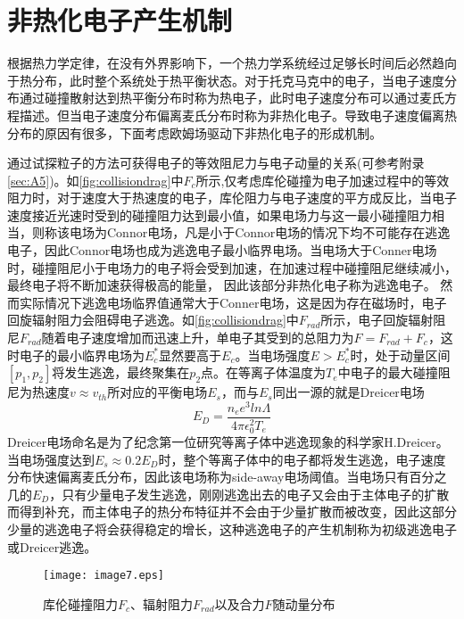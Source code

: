     

\section{非热化电子产生机制}
	根据热力学定律，在没有外界影响下，一个热力学系统经过足够长时间后必然趋向于热分布，此时整个系统处于热平衡状态。对于托克马克中的电子，当电子速度分布通过碰撞散射达到热平衡分布时称为热电子，此时电子速度分布可以通过麦氏方程描述。但当电子速度分布偏离麦氏分布时称为非热化电子。导致电子速度偏离热分布的原因有很多，下面考虑欧姆场驱动下非热化电子的形成机制。\par
	通过试探粒子的方法可获得电子的等效阻尼力与电子动量的关系\cite{RN814,RN1817}(可参考附录\autoref{sec:A5})。如\autoref{fig:collisiondrag}中$F_c$所示,仅考虑库伦碰撞为电子加速过程中的等效阻力时，对于速度大于热速度的电子，库伦阻力与电子速度的平方成反比，当电子速度接近光速时受到的碰撞阻力达到最小值，如果电场力与这一最小碰撞阻力相当，则称该电场为Connor电场\cite{RN1875}，凡是小于Connor电场的情况下均不可能存在逃逸电子，因此Connor电场也成为逃逸电子最小临界电场。当电场大于Conner电场时，碰撞阻尼小于电场力的电子将会受到加速，在加速过程中碰撞阻尼继续减小，最终电子将不断加速获得极高的能量， 因此该部分非热化电子称为逃逸电子。 然而实际情况下逃逸电场临界值通常大于Conner电场，这是因为存在磁场时，电子回旋辐射阻力会阻碍电子逃逸。如\autoref{fig:collisiondrag}中$F_{rad}$所示，电子回旋辐射阻尼$F_{rad}$随着电子速度增加而迅速上升，单电子其受到的总阻力为$F=F_{rad}+F_c$，这时电子的最小临界电场为$E_c^*$显然要高于$E_c$。当电场强度$E>E_c^*$时，处于动量区间$[p_1,p_2]$将发生逃逸，最终聚集在$p_2$点。在等离子体温度为$T_e$中电子的最大碰撞阻尼为热速度$v\approx v_{th}$所对应的平衡电场$E_s$，而与$E_s$同出一源的就是Dreicer电场
	\begin{equation}\label{eq:Dreicer_Field}
E_D=\frac{n_ee^3ln\Lambda}{4\pi \epsilon_0^2T_e}
\end{equation}
	Dreicer电场命名是为了纪念第一位研究等离子体中逃逸现象的科学家H.Dreicer\cite{RN954}。当电场强度达到$E_s\approx0.2E_D$时，整个等离子体中的电子都将发生逃逸，电子速度分布快速偏离麦氏分布，因此该电场称为side-away电场阈值。当电场只有百分之几的$E_D$，只有少量电子发生逃逸，刚刚逃逸出去的电子又会由于主体电子的扩散而得到补充，而主体电子的热分布特征并不会由于少量扩散而被改变，因此这部分少量的逃逸电子将会获得稳定的增长，这种逃逸电子的产生机制称为初级逃逸电子或Dreicer逃逸。
\begin{figure}[ht]
  \centering
  \texttt{[image: image7.eps]}
  \caption{\label{fig:collisiondrag} 库伦碰撞阻力$F_c$、辐射阻力$F_{rad}$以及合力$F$随动量分布 }
\end{figure} 

